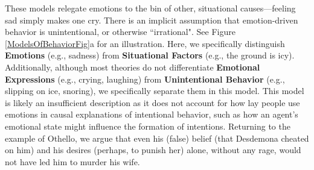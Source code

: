 \documentclass[10pt,letterpaper]{article}
\begin{document}

These models relegate emotions to the bin of other, situational causes---feeling sad simply makes one cry.
There is an implicit assumption that emotion-driven behavior is unintentional, or otherwise ``irrational". See Figure \ref{ModelsOfBehaviorFig}a for an illustration. Here, we specifically distinguish \textbf{Emotions} (e.g., sadness) from \textbf{Situational Factors} (e.g., the ground is icy). Additionally, although most theories do not differentiate \textbf{Emotional Expressions} (e.g., crying, laughing) from \textbf{Unintentional Behavior} (e.g., slipping on ice, snoring), we specifically separate them in this model. This model is likely an insufficient description as it does not account for how lay people use emotions in causal explanations of intentional behavior, such as how an agent's emotional state might influence the formation of intentions. Returning to the example of Othello, we argue that even his (false) belief (that Desdemona cheated on him) and his desires (perhaps, to punish her) alone, without any rage, would not have led him to murder his wife. 
\end{document}

